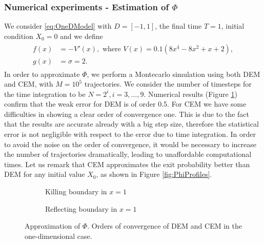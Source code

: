 \subsubsection{Numerical experiments - Estimation of $\Phi$}

We consider \eqref{eq:OneDModel} with $D = \left[ -1, 1 \right]$, the final time $T = 1$, initial condition $X_0 = 0$ and we define
\begin{align}\label{eq:FunctionsOneDSmoothPhi}
\begin{split}
	f(x) &= -V'(x), \text{ where } V(x) = 0.1(8x^4 - 8x^2 + x + 2), \\
	g(x) &= \sigma = 2.
\end{split}
\end{align}
In order to approximate $\Phi$, we perform a Montecarlo simulation using both DEM and CEM, with $M = 10^5$ trajectories. We consider the number of timesteps for the time integration to be $N = 2^i, i = 3, \dots, 9$. Numerical results (Figure \ref{fig:KillOneDPhi}) confirm that the weak error for DEM is of order 0.5. For CEM we have some difficulties in showing a clear order of convergence one. This is due to the fact that the results are accurate already with a big step size, therefore the statistical error is not negligible with respect to the error due to time integration. In order to avoid the noise on the order of convergence, it would be necessary to increase the number of trajectories dramatically, leading to unaffordable computational times. Let us remark that CEM approximates the exit probability better than DEM for any initial value $X_0$, as shown in Figure \ref{fig:PhiProfiles}.

\begin{figure}[t]
    \centering
    \begin{subfigure}{0.49\linewidth}
        \centering
        \resizebox{1\linewidth}{!}{ }  
        \caption{Killing boundary in $x = 1$}
        \label{fig:KillOneDPhi}
    \end{subfigure}
    \begin{subfigure}{0.49\linewidth}
        \centering
        \resizebox{1\linewidth}{!}{ }  
        \caption{Reflecting boundary in $x = 1$}
        \label{fig:ReflectOneDPhi}
    \end{subfigure}    
    \caption{Approximation of $\Phi$. Orders of convergence of DEM and CEM in the one-dimensional case.}
    \label{fig:OrdersOneDPhi}
\end{figure}

